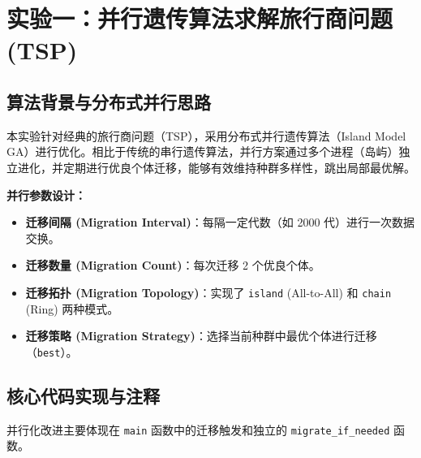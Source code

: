\documentclass[11pt,a4paper]{article}
\begin{document}
\section{实验一：并行遗传算法求解旅行商问题 (TSP)}

\subsection{算法背景与分布式并行思路}
本实验针对经典的旅行商问题（TSP），采用分布式并行遗传算法（Island Model GA）进行优化。相比于传统的串行遗传算法，并行方案通过多个进程（岛屿）独立进化，并定期进行优良个体迁移，能够有效维持种群多样性，跳出局部最优解。

\textbf{并行参数设计：}
\begin{itemize}
    \item \textbf{迁移间隔 (Migration Interval)}：每隔一定代数（如 2000 代）进行一次数据交换。
    \item \textbf{迁移数量 (Migration Count)}：每次迁移 2 个优良个体。
    \item \textbf{迁移拓扑 (Migration Topology)}：实现了 \texttt{island} (All-to-All) 和 \texttt{chain} (Ring) 两种模式。
    \item \textbf{迁移策略 (Migration Strategy)}：选择当前种群中最优个体进行迁移（\texttt{best}）。
\end{itemize}

\subsection{核心代码实现与注释}
并行化改进主要体现在 \texttt{main} 函数中的迁移触发和独立的 \texttt{migrate\_if\_needed} 函数。
\end{document}
